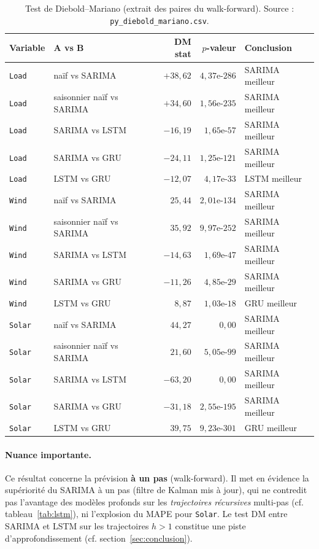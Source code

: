 \begin{table}[H]
\centering
\caption{Test de Diebold--Mariano (extrait des paires du walk-forward).
Source : \texttt{py\_diebold\_mariano.csv}.}
\label{tab:dm}
\small
\begin{tabular}{llrrl}
\toprule
Variable & A vs B & DM stat & $p$-valeur & Conclusion \\
\midrule
\texttt{Load}  & naïf vs SARIMA            & $+38{,}62$ & $4{,}37\text{e-}286$ & SARIMA meilleur \\
\texttt{Load}  & saisonnier naïf vs SARIMA & $+34{,}60$ & $1{,}56\text{e-}235$ & SARIMA meilleur \\
\texttt{Load}  & SARIMA vs LSTM            & $-16{,}19$ & $1{,}65\text{e-}57$  & SARIMA meilleur \\
\texttt{Load}  & SARIMA vs GRU             & $-24{,}11$ & $1{,}25\text{e-}121$ & SARIMA meilleur \\
\texttt{Load}  & LSTM vs GRU               & $-12{,}07$ & $4{,}17\text{e-}33$  & LSTM meilleur \\
\texttt{Wind}  & naïf vs SARIMA            & $25{,}44$  & $2{,}01\text{e-}134$ & SARIMA meilleur \\
\texttt{Wind}  & saisonnier naïf vs SARIMA & $35{,}92$  & $9{,}97\text{e-}252$ & SARIMA meilleur \\
\texttt{Wind}  & SARIMA vs LSTM            & $-14{,}63$ & $1{,}69\text{e-}47$  & SARIMA meilleur \\
\texttt{Wind}  & SARIMA vs GRU             & $-11{,}26$ & $4{,}85\text{e-}29$  & SARIMA meilleur \\
\texttt{Wind}  & LSTM vs GRU               & $8{,}87$   & $1{,}03\text{e-}18$  & GRU meilleur \\
\texttt{Solar} & naïf vs SARIMA            & $44{,}27$  & $0{,}00$             & SARIMA meilleur \\
\texttt{Solar} & saisonnier naïf vs SARIMA & $21{,}60$  & $5{,}05\text{e-}99$  & SARIMA meilleur \\
\texttt{Solar} & SARIMA vs LSTM            & $-63{,}20$ & $0{,}00$             & SARIMA meilleur \\
\texttt{Solar} & SARIMA vs GRU             & $-31{,}18$ & $2{,}55\text{e-}195$ & SARIMA meilleur \\
\texttt{Solar} & LSTM vs GRU               & $39{,}75$  & $9{,}23\text{e-}301$ & GRU meilleur \\
\bottomrule
\end{tabular}
\end{table}

\paragraph{Nuance importante.}
Ce résultat concerne la prévision \textbf{à un pas} (walk-forward). Il met en
évidence la supériorité du SARIMA à un pas (filtre de Kalman mis à jour),
qui ne contredit pas l'avantage des modèles profonds sur les \emph{trajectoires
récursives} multi-pas (cf. tableau~\ref{tab:lstm}), ni l'explosion du MAPE
pour \texttt{Solar}. Le test DM entre SARIMA et LSTM sur les trajectoires
\(h>1\) constitue une piste d'approfondissement
(cf. section~\ref{sec:conclusion}).
